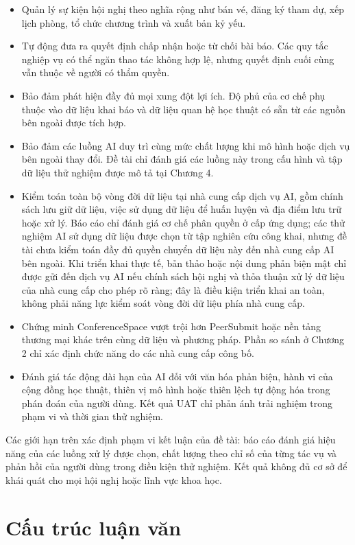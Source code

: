 \begin{itemize}
\item Quản lý sự kiện hội nghị theo nghĩa rộng như bán vé, đăng ký tham dự, xếp lịch phòng, tổ chức chương trình và xuất bản kỷ yếu.
\item Tự động đưa ra quyết định chấp nhận hoặc từ chối bài báo. Các quy tắc nghiệp vụ có thể ngăn thao tác không hợp lệ, nhưng quyết định cuối cùng vẫn thuộc về người có thẩm quyền.
\item Bảo đảm phát hiện đầy đủ mọi xung đột lợi ích. Độ phủ của cơ chế phụ thuộc vào dữ liệu khai báo và dữ liệu quan hệ học thuật có sẵn từ các nguồn bên ngoài được tích hợp.
\item Bảo đảm các luồng AI duy trì cùng mức chất lượng khi mô hình hoặc dịch vụ bên ngoài thay đổi. Đề tài chỉ đánh giá các luồng này trong cấu hình và tập dữ liệu thử nghiệm được mô tả tại Chương 4.
\item Kiểm toán toàn bộ vòng đời dữ liệu tại nhà cung cấp dịch vụ AI, gồm chính sách lưu giữ dữ liệu, việc sử dụng dữ liệu để huấn luyện và địa điểm lưu trữ hoặc xử lý. Báo cáo chỉ đánh giá cơ chế phân quyền ở cấp ứng dụng; các thử nghiệm AI sử dụng dữ liệu được chọn từ tập nghiên cứu công khai, nhưng đề tài chưa kiểm toán đầy đủ quyền chuyển dữ liệu này đến nhà cung cấp AI bên ngoài. Khi triển khai thực tế, bản thảo hoặc nội dung phản biện mật chỉ được gửi đến dịch vụ AI nếu chính sách hội nghị và thỏa thuận xử lý dữ liệu của nhà cung cấp cho phép rõ ràng; đây là điều kiện triển khai an toàn, không phải năng lực kiểm soát vòng đời dữ liệu phía nhà cung cấp.
\item Chứng minh ConferenceSpace vượt trội hơn PeerSubmit hoặc nền tảng thương mại khác trên cùng dữ liệu và phương pháp. Phần so sánh ở Chương 2 chỉ xác định chức năng do các nhà cung cấp công bố.
\item Đánh giá tác động dài hạn của AI đối với văn hóa phản biện, hành vi của cộng đồng học thuật, thiên vị mô hình hoặc thiên lệch tự động hóa trong phán đoán của người dùng. Kết quả UAT chỉ phản ánh trải nghiệm trong phạm vi và thời gian thử nghiệm.
\end{itemize}

Các giới hạn trên xác định phạm vi kết luận của đề tài: báo cáo đánh giá hiệu năng của các luồng xử lý được chọn, chất lượng theo chỉ số của từng tác vụ và phản hồi của người dùng trong điều kiện thử nghiệm. Kết quả không đủ cơ sở để khái quát cho mọi hội nghị hoặc lĩnh vực khoa học.

\section{Cấu trúc luận văn}

